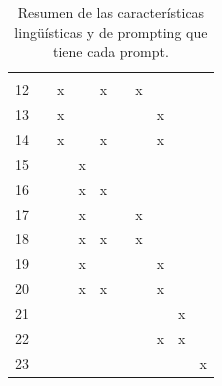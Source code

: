 \begin{landscape}
\begin{table}[p]
{\begin{tabular}{@{}clllllllll@{}}
   &
   &
   \\
12 &
   &
  \multicolumn{1}{c}{x} &
   &
  \multicolumn{1}{c}{x} &
   &
  \multicolumn{1}{c}{x} &
   &
   &
   \\
13 &
   &
  \multicolumn{1}{c}{x} &
   &
   &
   &
   &
  \multicolumn{1}{c}{x} &
   &
   \\
14 &
   &
  \multicolumn{1}{c}{x} &
   &
  \multicolumn{1}{c}{x} &
   &
   &
  \multicolumn{1}{c}{x} &
   &
   \\
15 &
   &
   &
  \multicolumn{1}{c}{x} &
   &
   &
   &
   &
   &
   \\
16 &
   &
   &
  \multicolumn{1}{c}{x} &
  \multicolumn{1}{c}{x} &
   &
   &
   &
   &
   \\
17 &
   &
   &
  \multicolumn{1}{c}{x} &
   &
   &
  \multicolumn{1}{c}{x} &
   &
   &
   \\
18 &
   &
   &
  \multicolumn{1}{c}{x} &
  \multicolumn{1}{c}{x} &
   &
  \multicolumn{1}{c}{x} &
   &
   &
   \\
19 &
   &
   &
  \multicolumn{1}{c}{x} &
   &
   &
   &
  \multicolumn{1}{c}{x} &
   &
   \\
20 &
   &
   &
  \multicolumn{1}{c}{x} &
  \multicolumn{1}{c}{x} &
   &
   &
  \multicolumn{1}{c}{x} &
   &
   \\
21 &
   &
   &
   &
   &
   &
   &
   &
  \multicolumn{1}{c}{x} &
   \\
22 &
   &
   &
   &
   &
   &
   &
  \multicolumn{1}{c}{x} &
  \multicolumn{1}{c}{x} &
   \\
23 &
   &
   &
   &
   &
   &
   &
   &
   &
  \multicolumn{1}{c}{x} \\ \bottomrule
\end{tabular}}
\caption{Resumen de las características lingüísticas y de prompting que tiene cada prompt.}
\label{tab:resumen_prompts}
\end{table}
\end{landscape}